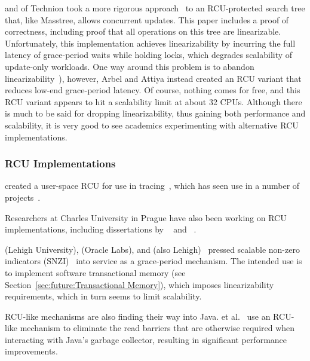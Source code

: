  and  of Technion took a more rigorous
approach~\cite{MayaArbel2014RCUtree} to an RCU-protected search tree that,
like Masstree, allows concurrent updates.
This paper includes a proof of correctness, including proof that all
operations on this tree are linearizable.
Unfortunately, this implementation achieves linearizability by incurring
the full latency of grace-period waits while holding locks, which degrades
scalability of update-only workloads.
One way around this problem is to abandon
linearizability~\cite{AndreasHaas2012FIFOisnt,PaulEMcKennneyAtomicTreeN4037}),
however, Arbel and Attiya instead created an RCU variant that reduces
low-end grace-period latency.
Of course, nothing comes for free, and this RCU variant appears to hit
a scalability limit at about 32 CPUs.
Although there is much to be said for dropping linearizability, thus
gaining both performance and scalability, it is very good to see academics
experimenting with alternative RCU implementations.

\subsubsection{RCU Implementations}
\label{sec:defer:RCU Implementations}

 created a user-space RCU for use in
tracing~\cite{MathieuDesnoyers2009URCU,MathieuDesnoyersPhD,MathieuDesnoyers2012URCU},
which has seen use in a number of projects~\cite{MikeDay2013RCUqemu}.

Researchers at Charles University in Prague have also been
working on RCU implementations, including dissertations by
~\cite{AndrejPodzimek2010masters} and
~\cite{AdamHraska2013RCUHelenOS}.

 (Lehigh University),  (Oracle Labs), and
 (also Lehigh)~\cite{Liu:2013:MSA:2549695.2549732}
pressed scalable non-zero indicators
(SNZI)~\cite{FaithEllen:2007:SNZI} into service as a grace-period
mechanism.
The intended use is to implement software transactional memory
(see Section~\ref{sec:future:Transactional Memory}), which
imposes linearizability requirements, which in turn seems to
limit scalability.

RCU-like mechanisms are also finding their way into Java.
 et al.~\cite{Sivaramakrishnan:2012:ERB:2258996.2259005}
use an RCU-like mechanism to eliminate the read barriers that are
otherwise required when interacting with Java's garbage collector,
resulting in significant performance improvements.

